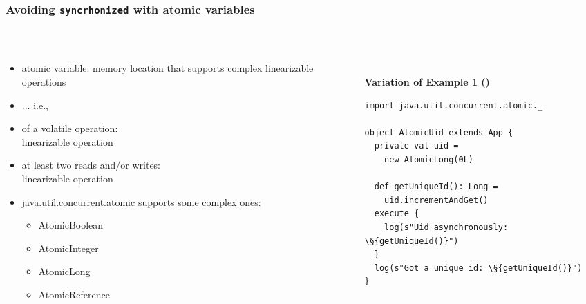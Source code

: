 \documentclass[aspectratio=169]{beamer}
\begin{document}
\begin{frame}[fragile]\frametitle{Avoiding \texttt{syncrhonized} with atomic variables}
~\\[-8mm]
\begin{columns}
\begin{column}{0.57\textwidth}
\begin{itemize}
  \item \alert{atomic variable}: memory location that supports \alert{complex linearizable operations}
  \item ... i.e., 
  \item {} of a volatile operation:
      \\  linearizable operation
  \item at least two reads and/or writes:
      \\  linearizable operation
  \pause
  \item \alert{java.util.concurrent.atomic} supports some complex ones:
    \begin{itemize}
       \item AtomicBoolean
       \item AtomicInteger
       \item AtomicLong
       \item AtomicReference  
    \end{itemize}
\end{itemize}
\end{column}
\begin{column}{0.45\textwidth}
~\\
\textbf{Variation of Example 1 ()}
\begin{lstlisting}[emph={execute,sleep,log,global,AtomicLong,incrementAndGet}]
import java.util.concurrent.atomic._

object AtomicUid extends App {
  private val uid =
    new AtomicLong(0L)

  def getUniqueId(): Long =
    uid.incrementAndGet()
  execute {
    log(s"Uid asynchronously: \§{getUniqueId()}")
  }
  log(s"Got a unique id: \§{getUniqueId()}")
}
\end{lstlisting}
\end{column}
\end{columns}
\end{frame}
\end{document}
